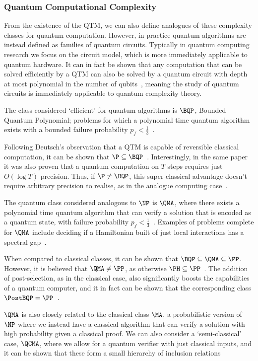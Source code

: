 \subsubsection{Quantum Computational Complexity}
From the existence of the QTM, we can also define analogues of these complexity classes for quantum computation. However, in practice quantum algorithms are instead defined as families of quantum circuits. Typically in quantum computing research we focus on the circuit model, which is more immediately applicable to quantum hardware. It can in fact be shown that any computation that can be solved efficiently by a QTM can also be solved by a quantum circuit with depth at most polynomial in the number of qubits~\cite{Yao1993}, meaning the study of quantum circuits is immediately applicable to quantum complexity theory.\par 
The class considered `efficient' for quantum algorithms is $\BQP$, Bounded Quantum Polynomial; problems for which a polynomial time quantum algorithm exists with a bounded failure probability $p_{f}<\frac{1}{3}$~\cite{Nielsen2000}.
\par
Following Deutsch's observation that a QTM is capable of reversible classical computation, it can be shown that $\P\subseteq \BQP$~\cite{Bernstein1997}. Interestingly, in the same paper it was also proven that a quantum computation on $T$ steps requires just $O\left(\log{T}\right)$ precision. Thus, if $\P\neq \BQP$, this super-classical advantage doesn't require arbitrary precision to realise, as in the analogue computing case~\cite{Bernstein1997}.\par
The quantum class considered analogous to $\NP$ is $\QMA$, where there exists a polynomial time quantum algorithm that can verify a solution that is encoded as a quantum state, with failure probability $p_{f}<\frac{1}{3}$~\cite{Watrous2008}. Examples of problems complete for $\QMA$ include deciding if a Hamiltonian built of just local interactions has a spectral gap~\cite{Kempe2004}.\par
When compared to classical classes, it can be shown that $\BQP\subseteq \QMA\subseteq \PP$. However, it is believed that $\QMA\neq \PP$, as otherwise $\PH\subseteq \PP$~\cite{Vyalyi03}. The addition of post-selection, as in the classical case, also significantly boosts the capabilities of a quantum computer, and it in fact can be shown that the corresponding class $\PostBQP=\PP$~\cite{Aaronson2004c}.\par
$\QMA$ is also closely related to the classical class $\MA$, a probabilistic version of $\NP$ where we instead have a classical algorithm that can verify a solution with high probability given a classical proof. We can also consider a `semi-classical' case, $\QCMA$, where we allow for a quantum verifier with just classical inputs, and it can be shown that these form a small hierarchy of inclusion relations~\cite{Aharonov2002}
